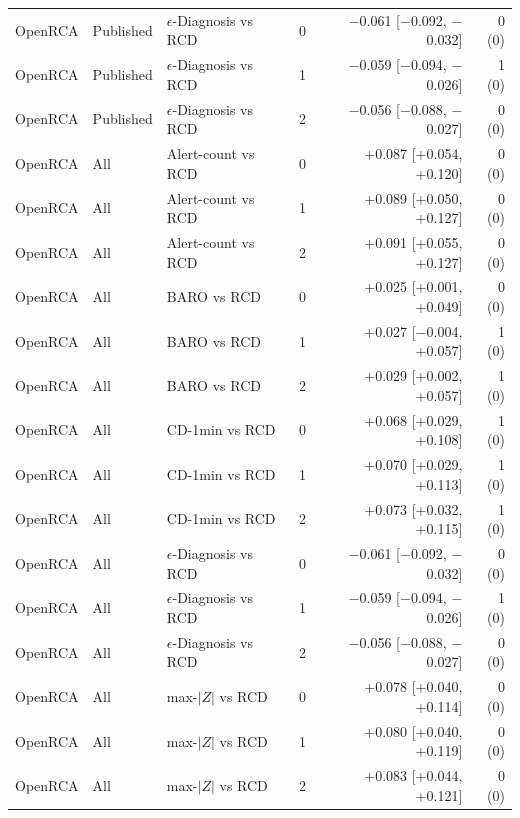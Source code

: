 {\begin{longtable}{llllrr}
OpenRCA & Published & $\epsilon$-Diagnosis vs RCD & 0 & $-$0.061 [$-$0.092, $-$0.032] & 0 (0) \\
OpenRCA & Published & $\epsilon$-Diagnosis vs RCD & 1 & $-$0.059 [$-$0.094, $-$0.026] & 1 (0) \\
OpenRCA & Published & $\epsilon$-Diagnosis vs RCD & 2 & $-$0.056 [$-$0.088, $-$0.027] & 0 (0) \\
OpenRCA & All & Alert-count vs RCD & 0 & +0.087 [+0.054, +0.120] & 0 (0) \\
OpenRCA & All & Alert-count vs RCD & 1 & +0.089 [+0.050, +0.127] & 0 (0) \\
OpenRCA & All & Alert-count vs RCD & 2 & +0.091 [+0.055, +0.127] & 0 (0) \\
OpenRCA & All & BARO vs RCD & 0 & +0.025 [+0.001, +0.049] & 0 (0) \\
OpenRCA & All & BARO vs RCD & 1 & +0.027 [$-$0.004, +0.057] & 1 (0) \\
OpenRCA & All & BARO vs RCD & 2 & +0.029 [+0.002, +0.057] & 1 (0) \\
OpenRCA & All & CD-1min vs RCD & 0 & +0.068 [+0.029, +0.108] & 1 (0) \\
OpenRCA & All & CD-1min vs RCD & 1 & +0.070 [+0.029, +0.113] & 1 (0) \\
OpenRCA & All & CD-1min vs RCD & 2 & +0.073 [+0.032, +0.115] & 1 (0) \\
OpenRCA & All & $\epsilon$-Diagnosis vs RCD & 0 & $-$0.061 [$-$0.092, $-$0.032] & 0 (0) \\
OpenRCA & All & $\epsilon$-Diagnosis vs RCD & 1 & $-$0.059 [$-$0.094, $-$0.026] & 1 (0) \\
OpenRCA & All & $\epsilon$-Diagnosis vs RCD & 2 & $-$0.056 [$-$0.088, $-$0.027] & 0 (0) \\
OpenRCA & All & max-$|Z|$ vs RCD & 0 & +0.078 [+0.040, +0.114] & 0 (0) \\
OpenRCA & All & max-$|Z|$ vs RCD & 1 & +0.080 [+0.040, +0.119] & 0 (0) \\
OpenRCA & All & max-$|Z|$ vs RCD & 2 & +0.083 [+0.044, +0.121] & 0 (0) \\
\end{longtable}
}
